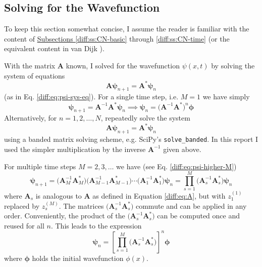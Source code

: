 \documentclass[11pt, a4paper]{article}
\newcommand{\mat}[1]{\mathbf{#1}}
\begin{document}
\subsection{Solving for the Wavefunction}
To keep this section somewhat concise, I assume the reader is familiar with the content of \hyperref[diff:ss:CN-basic]{Subsections \ref{diff:ss:CN-basic}} through \ref{diff:ss:CN-time} (or the equivalent content in van Dijk \cite{vandijk}).

\vspace{1mm}
With the matrix $ \mat{A} $ known, I solved for the wavefunction $ \psi(x, t) $ by solving the system of equations
\begin{equation*}
	\mat{A}\bm{\psi}_{n+1} = \mat{A}^{*}\bm{\psi}_{n}
\end{equation*}
(as in Eq. \ref{diff:eq:psi-sys-eq}). For a single time step, i.e. $ M = 1 $ we have simply
\begin{equation*}
	\bm{\psi}_{n+1} = \mat{A}^{-1}\mat{A}^{*}\bm{\psi}_{n} \implies \bm{\psi}_{n} = \big(\mat{A}^{-1}\mat{A}^{*}\big)^{n} \bm{\phi}
\end{equation*}
Alternatively, for $ n = 1, 2, \ldots, N $, repeatedly solve the system
\begin{equation*}
 \mat{A}\bm{\psi}_{n+1} = \mat{A}^{*}\bm{\psi}_{n}
\end{equation*}
using a banded matrix solving scheme, e.g. SciPy's \texttt{solve\_banded}. In this report I used the simpler multiplication by the inverse $ \mat{A}^{-1} $ given above.

\vspace{2mm}
For multiple time steps $ M = 2, 3, \ldots $ we have (see Eq. \ref{diff:eq:psi-higher-M})
\begin{equation*}
	\bm{\psi}_{n+1} = \big(\mat{A}_{M}^{-1}\mat{A}_{M}^{*}\big)\big(\mat{A}_{M-1}^{-1}\mat{A}_{M-1}^{*}\big)\cdots \big(\mat{A}_{1}^{-1}\mat{A}_{1}^{*}\big)\bm{\psi}_{n} = \prod_{s=1}^{M}\big(\mat{A}_{s}^{-1}\mat{A}_{s}^{*}\big) \bm{\psi}_{n}
\end{equation*}
where $ \mat{A}_{s} $ is analogous to $ \mat{A} $ as defined in Equation \ref{diff:eq:A}, but with $ z_{1}^{(1)} $ replaced by $ z_{s}^{(M)} $. The matrices $ \big(\mat{A}_{s}^{-1}\mat{A}_{s}^{*}\big) $ commute and can be applied in any order. Conveniently, the product of the $ \big(\mat{A}_{s}^{-1}\mat{A}_{s}^{*}\big) $ can be computed once and reused for all $ n $. This leads to the expression
\begin{equation*}
	\bm{\psi}_{n} = \left[\prod_{s=1}^{M}\big(\mat{A}_{s}^{-1}\mat{A}_{s}^{*}\big)\right]^{n} \bm{\phi}
\end{equation*}
where $ \bm{\phi} $ holds the initial wavefunction $ \phi(x) $.
\end{document}
